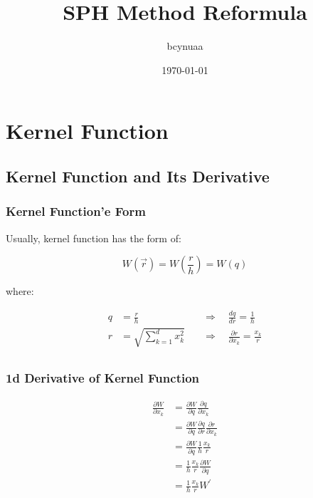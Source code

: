 \documentclass[10pt, oneside]{article}
\title{SPH Method Reformula}
\author{bcynuaa}
\date{\today}
\begin{document}
\maketitle
\tableofcontents

\vspace{.25in}

\section{Kernel Function}

\subsection{Kernel Function and Its Derivative}

\subsubsection{Kernel Function'e Form}

Usually, 
kernel function has the form of:

\begin{equation}
    W(\vec{r})=W\left(
        \frac{r}{h}
    \right)=W(q)
\end{equation}

where:

\begin{equation}
    \begin{aligned}
        q &= \frac{r}{h} \quad &\Rightarrow \quad \frac{dq}{dr}= \frac{1}{h}\\
        r &= \sqrt{\sum_{k=1}^d x_k^2} \quad &\Rightarrow \quad \frac{\partial r}{\partial x_k} = \frac{x_k}{r}\\
    \end{aligned}
\end{equation}

\subsubsection{1d Derivative of Kernel Function}

\begin{equation}
    \begin{aligned}
        \frac{\partial W}{\partial x_k} &= \frac{\partial W}{\partial q}\frac{\partial q}{\partial x_k}\\
        &= \frac{\partial W}{\partial q}\frac{\partial q}{\partial r}\frac{\partial r}{\partial x_k}\\
        &= \frac{\partial W}{\partial q}\frac{1}{h}\frac{x_k}{r}\\
        &= \frac{1}{h}\frac{x_k}{r}\frac{\partial W}{\partial q}\\
        &= \frac{1}{h}\frac{x_k}{r}W^\prime
    \end{aligned}
\end{equation}
\end{document}
